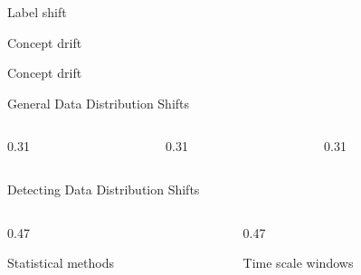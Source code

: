 \begin{frame}{Label shift}
  \begin{withmargin}
    \begin{tdmain}
    \end{tdmain}
    \begin{tdmargin}
    \end{tdmargin}
  \end{withmargin}
\end{frame}

\begin{frame}{Concept drift}
  \begin{withmargin}
    \begin{tdmain}
      \begin{tddef}{Concept drift}
      \end{tddef}
    \end{tdmain}
    \begin{tdmargin}
    \end{tdmargin}
  \end{withmargin}
\end{frame}

\begin{frame}{General Data Distribution Shifts}
  \begin{columns}[T,onlytextwidth]
    \begin{column}{0.31\textwidth}
      \begin{tdblock}[equal height group=gen]
      \end{tdblock}
    \end{column}
    \begin{column}{0.31\textwidth}
      \begin{tdblock}[equal height group=gen]
      \end{tdblock}
    \end{column}
    \begin{column}{0.31\textwidth}
      \begin{tdblock}[equal height group=gen]
      \end{tdblock}
    \end{column}
  \end{columns}
\end{frame}

\begin{frame}{Detecting Data Distribution Shifts}
  \begin{columns}[T,onlytextwidth]
    \begin{column}{0.47\textwidth}
      \begin{tdblockt}[equal height group=det]{Statistical methods}
      \end{tdblockt}
    \end{column}
    \begin{column}{0.47\textwidth}
      \begin{tdblockt}[equal height group=det]{Time scale windows}
      \end{tdblockt}
    \end{column}
  \end{columns}
\end{frame}

